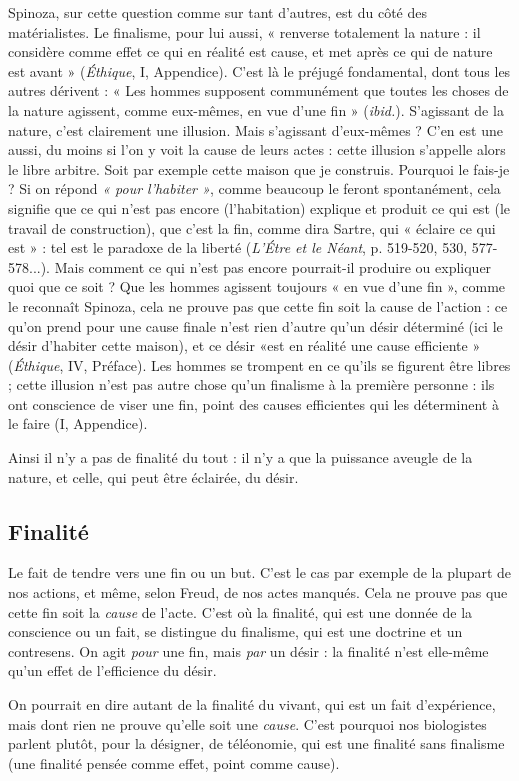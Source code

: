 Spinoza, sur cette question comme sur tant d’autres, est du côté des matérialistes.
Le finalisme, pour lui aussi, « renverse totalement la nature : il considère
comme effet ce qui en réalité est cause, et met après ce qui de nature est
avant » ({\it Éthique}, I, Appendice). C’est là le préjugé fondamental, dont tous les
autres dérivent : « Les hommes supposent communément que toutes les choses
de la nature agissent, comme eux-mêmes, en vue d’une fin » ({\it ibid.}). S'agissant
de la nature, c’est clairement une illusion. Mais s'agissant d’eux-mêmes ? C'en
est une aussi, du moins si l’on y voit la cause de leurs actes : cette illusion
s'appelle alors le libre arbitre. Soit par exemple cette maison que je construis.
Pourquoi le fais-je ? Si on répond {\it « pour l'habiter »}, comme beaucoup le feront
spontanément, cela signifie que ce qui n’est pas encore (l’habitation) explique
et produit ce qui est (le travail de construction), que c’est la fin, comme dira
Sartre, qui « éclaire ce qui est » : tel est le paradoxe de la liberté ({\it L'Étre et le
Néant}, p. 519-520, 530, 577-578...). Mais comment ce qui n’est pas encore
pourrait-il produire ou expliquer quoi que ce soit ? Que les hommes agissent
toujours « en vue d’une fin », comme le reconnaît Spinoza, cela ne prouve pas
que cette fin soit la cause de l’action : ce qu’on prend pour une cause finale
n’est rien d’autre qu’un désir déterminé (ici le désir d’habiter cette maison),
et ce désir «est en réalité une cause efficiente » ({\it Éthique}, IV, Préface). Les
hommes se trompent en ce qu’ils se figurent être libres ; cette illusion n’est
pas autre chose qu’un finalisme à la première personne : ils ont conscience de
viser une fin, point des causes efficientes qui les déterminent à le faire
(I, Appendice).

Ainsi il n’y a pas de finalité du tout : il n’y a que la puissance aveugle de la
nature, et celle, qui peut être éclairée, du désir.

\subsection{Finalité}

Le fait de tendre vers une fin ou un but. C’est le cas par exemple
de la plupart de nos actions, et même, selon Freud, de nos actes
manqués. Cela ne prouve pas que cette fin soit la {\it cause} de l’acte. C’est où la
finalité, qui est une donnée de la conscience ou un fait, se distingue du finalisme,
qui est une doctrine et un contresens. On agit {\it pour} une fin, mais {\it par} un
désir : la finalité n’est elle-même qu’un effet de l'efficience du désir.

On pourrait en dire autant de la finalité du vivant, qui est un fait d’expérience,
mais dont rien ne prouve qu’elle soit une {\it cause}. C’est pourquoi nos biologistes
parlent plutôt, pour la désigner, de téléonomie, qui est une finalité sans
finalisme (une finalité pensée comme effet, point comme cause).

